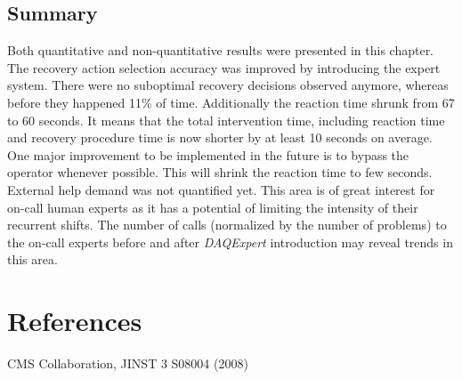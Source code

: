 \documentclass[a4paper]{jpconf}
\begin{document}
\subsection{Summary}
Both quantitative and non-quantitative results were presented in this chapter. The recovery action selection accuracy was improved by introducing the expert system. There were no suboptimal recovery decisions observed anymore, whereas before they happened 11\% of time. Additionally the reaction time shrunk from 67 to 60 seconds. It means that the total intervention time, including reaction time and recovery procedure time is now shorter by at least 10 seconds on average. One major improvement to be implemented in the future is to bypass the operator whenever possible. This will shrink the reaction time to few seconds.
External help demand was not quantified yet. This area is of great interest for on-call human experts as it has a potential of limiting the intensity of their recurrent shifts. The number of calls (normalized by the number of problems) to the on-call experts before and after {\it DAQExpert} introduction may reveal trends in this area.


\section*{References}
\begin{thebibliography}{9}

 CMS Collaboration, JINST 3 S08004 (2008)
\end{thebibliography}
\end{document}
